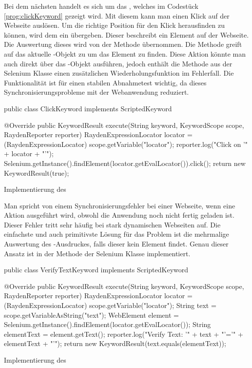\SuperPar
Bei dem nächsten  handelt es sich um das , welches im Codestück \ref{prog:clickKeyword} gezeigt wird. Mit diesem  kann man einen Klick auf der Webseite auslösen. Um die richtige Position für den Klick herausfinden zu können, wird dem  ein  übergeben. Dieser  beschreibt ein Element auf der Webseite. Die Auswertung dieses  wird von der Methode  übernommen. Die Methode greift auf das aktuelle -Objekt zu um das Element zu finden. Diese Aktion könnte man auch direkt über das -Objekt ausführen, jedoch enthält die Methode  aus der Selenium Klasse einen zusätzlichen Wiederholungsfunktion im Fehlerfall. Die Funktionalität ist für einen stabilen Abnahmetest wichtig, da dieses Synchronisierungsprobleme mit der Webanwendung reduziert. 

\begin{program}
\begin{JavaCode}
public class ClickKeyword implements ScriptedKeyword {

  @Override
  public KeywordResult execute(String keyword, KeywordScope scope, RaydenReporter reporter) {
    RaydenExpressionLocator locator = (RaydenExpressionLocator) scope.getVariable("locator");
    reporter.log("Click on '" + locator + "'");
    Selenium.getInstance().findElement(locator.getEvalLocator()).click();
    return new KeywordResult(true);
  }
}
\end{JavaCode}
\caption{Implementierung des }
\label{prog:clickKeyword}
\end{program}

\SuperPar
Man spricht von einem Synchronisierungsfehler bei einer Webseite, wenn eine Aktion ausgeführt wird, obwohl die Anwendung noch nicht fertig geladen ist. Dieser Fehler tritt sehr häufig bei stark dynamischen Webseiten auf. Die einfachste und auch primitivste Lösung für das Problem ist die mehrmalige Auswertung des -Ausdruckes, falls dieser kein Element findet. Genau dieser Ansatz ist in der  Methode der Selenium Klasse implementiert.

\begin{program}
\begin{JavaCode}
public class VerifyTextKeyword implements ScriptedKeyword {

  @Override
  public KeywordResult execute(String keyword, KeywordScope scope, RaydenReporter reporter) {
    RaydenExpressionLocator locator = (RaydenExpressionLocator) scope.getVariable("locator");
    String text = scope.getVariableAsString("text");
    WebElement element = Selenium.getInstance().findElement(locator.getEvalLocator());
    String elementText = element.getText();
    reporter.log("Verify Text: '" + text + "'='" + elementText + "'");
    return new KeywordResult(text.equals(elementText));
  }
}
\end{JavaCode}
\caption{Implementierung des }
\label{prog:verifyTextKeyword}
\end{program}

